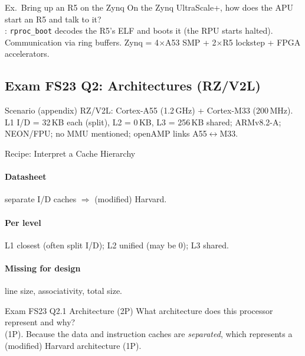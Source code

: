 \begin{example2}{Ex.\ Bring up an R5 on the Zynq}
    On the Zynq UltraScale+, how does the APU start an R5 and talk to it?
     \\ 
    : \texttt{rproc\_boot} decodes the R5's ELF and boots it (the RPU starts halted). Communication via  ring buffers. Zynq = 4$\times$A53 SMP + 2$\times$R5 lockstep + FPGA accelerators.
\end{example2}

\multend

\raggedcolumns
\columnbreak

\subsection{Exam FS23 Q2: Architectures (RZ/V2L)}

\begin{concept}{Scenario (appendix)}
    RZ/V2L: Cortex-A55 (1.2\,GHz) + Cortex-M33 (200\,MHz). L1 I/D = 32\,KB each (split), L2 = 0\,KB, L3 = 256\,KB shared; ARMv8.2-A; NEON/FPU; no MMU mentioned; openAMP links A55$\leftrightarrow$M33.
\end{concept}

\begin{KR}{Recipe: Interpret a Cache Hierarchy}
    \paragraph{Datasheet} separate I/D caches $\Rightarrow$ (modified) Harvard.
    \paragraph{Per level} L1 closest (often split I/D); L2 unified (may be 0); L3 shared.
    \paragraph{Missing for design} line size, associativity, total size.
\end{KR}

\begin{example2}{Exam FS23 Q2.1 Architecture (2P)}
    What architecture does this processor represent and why?
     \\ 
     (1P). Because the data and instruction caches are \emph{separated}, which represents a (modified) Harvard architecture (1P).
\end{example2}

